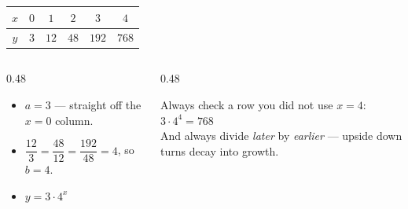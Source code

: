 \documentclass[aspectratio=169, 11pt]{beamer}
\begin{document}
\begin{frame}[t, plain]
  \begin{center}
  \renewcommand{\arraystretch}{1.4}
  \begin{tabular}{|c|c|c|c|c|c|}
  \hline
  $x$ & $0$ & $1$ & $2$ & $3$ & $4$ \\ \hline
  $y$ & $3$ & $12$ & $48$ & $192$ & $768$ \\ \hline
  \end{tabular}
  \end{center}
  \vspace{4pt}
  \begin{columns}[T]
    \begin{column}{0.48\textwidth}
      \begin{itemize}\setlength{\itemsep}{4pt}
        \item $a=3$ --- straight off the $x=0$ column.
        \item $\dfrac{12}{3}=\dfrac{48}{12}=\dfrac{192}{48}=4$, so $b=4$.
        \item $y = 3\cdot 4^{x}$
      \end{itemize}
    \end{column}
    \begin{column}{0.48\textwidth}
      \begin{block}{Always check a row you did not use}
        $x=4$: \; $3\cdot4^{4}=768$ \checkmark \\[3pt]
        {\scriptsize And always divide \emph{later} by \emph{earlier} --- upside down turns decay
        into growth.}
      \end{block}
    \end{column}
  \end{columns}
\end{frame}
\end{document}
